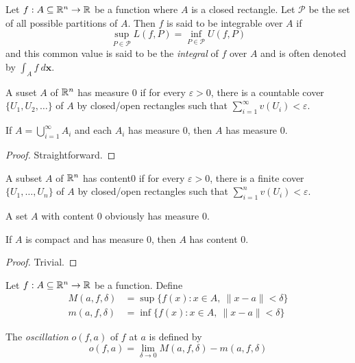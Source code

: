 \begin{definition}
    Let $f:A\subseteq\mathbb{R}^n\to\mathbb{R}$ be a function where $A$ is a closed rectangle. Let $\mathscr{P}$ be the set of all possible partitions of $A$. Then $f$ is said to be integrable over $A$ if 
    \begin{equation*}
        \sup_{P\in\mathscr{P}}L(f,P) = \inf_{P\in\mathscr{P}}U(f,P)
    \end{equation*}
    and this common value is said to be the \textit{integral} of $f$ over $A$ and is often denoted by $\int_A f~d\mathbf{x}$.
\end{definition}

\begin{definition}
    A suset $A$ of $\mathbb{R}^n$ has measure $0$ if for every $\varepsilon > 0$, there is a countable cover $\{U_1, U_2,\ldots\}$ of $A$ by closed/open rectangles such that $\sum_{i = 1}^\infty v(U_i) < \varepsilon$.
\end{definition}

\begin{proposition}
    If $A = \bigcup_{i = 1}^\infty A_i$ and each $A_i$ has measure $0$, then $A$ has measure $0$.
\end{proposition}
\begin{proof}
    Straightforward.
\end{proof}

\begin{definition}
    A subset $A$ of $\mathbb{R}^n$ has content$0$ if for every $\varepsilon > 0$, there is a finite cover $\{U_1,\ldots,U_n\}$ of $A$ by closed/open rectangles such that $\sum_{i = 1}^n v(U_i) < \varepsilon$.
\end{definition}

A set $A$ with content $0$ obviously has measure $0$.

\begin{proposition}
    If $A$ is compact and has measure $0$, then $A$ has content $0$.
\end{proposition}
\begin{proof}
    Trivial.
\end{proof}

\begin{definition}[Oscillation]
    Let $f:A\subseteq\mathbb{R}^n\to\mathbb{R}$ be a function. Define 
    \begin{align*}
        M(a,f,\delta) &= \sup\{f(x): x\in A,~\|x - a\| < \delta\}\\
        m(a,f,\delta) &= \inf\{f(x): x\in A,~\|x - a\| < \delta\}
    \end{align*}

    The \textit{oscillation} $o(f,a)$ of $f$ at $a$ is defined by 
    \begin{equation*}
        o(f,a) = \lim_{\delta\to0}M(a,f,\delta) - m(a,f,\delta)
    \end{equation*}
\end{definition}

